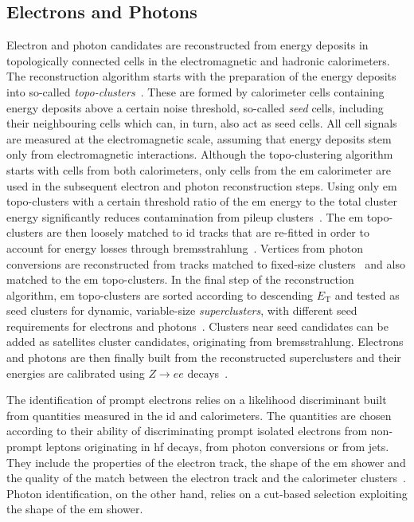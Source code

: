 \subsection{Electrons and Photons}

Electron and photon candidates are reconstructed from energy deposits in topologically connected cells in the electromagnetic and hadronic calorimeters. The reconstruction algorithm starts with the preparation of the energy deposits into so-called \textit{topo-clusters}~\cite{PERF-2014-07}. These are formed by calorimeter cells containing energy deposits above a certain noise threshold, so-called \textit{seed} cells, including their neighbouring cells which can, in turn, also act as seed cells. All cell signals are measured at the electromagnetic scale, assuming that energy deposits stem only from electromagnetic interactions. Although the topo-clustering algorithm starts with cells from both calorimeters, only cells from the \gls{em} calorimeter are used in the subsequent electron and photon reconstruction steps. Using only \gls{em} topo-clusters with a certain threshold ratio of the \gls{em} energy to the total cluster energy significantly reduces contamination from pileup clusters~\cite{EGAM-2018-01}. The \gls{em} topo-clusters are then loosely matched to \gls{id} tracks that are re-fitted in order to account for energy losses through bremsstrahlung~\cite{EGAM-2018-01}. Vertices from photon conversions are reconstructed from tracks matched to fixed-size clusters~\cite{PERF-2017-02} and also matched to the \gls{em} topo-clusters. In the final step of the reconstruction algorithm, \gls{em} topo-clusters are sorted according to descending $E_{\mathrm{T}}$ and tested as seed clusters for dynamic, variable-size \textit{superclusters}, with different seed requirements for electrons and photons~\cite{EGAM-2018-01}. Clusters near seed candidates can be added as satellites cluster candidates, originating \eg from bremsstrahlung. Electrons and photons are then finally built from the reconstructed superclusters and their energies are calibrated using $Z\rightarrow ee$ decays~\cite{PERF-2017-03}.

The identification of prompt electrons relies on a likelihood discriminant built from quantities measured in the \gls{id} and calorimeters. The quantities are chosen according to their ability of discriminating prompt isolated electrons from non-prompt leptons originating in \gls{hf} decays, from photon conversions or from jets. They include the properties of the electron track, the shape of the \gls{em} shower and the quality of the match between the electron track and the calorimeter clusters~\cite{PERF-2017-01}. Photon identification, on the other hand, relies on a cut-based selection exploiting the shape of the \gls{em} shower.

